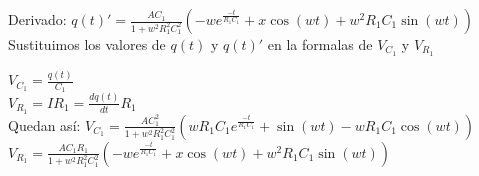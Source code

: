 \documentclass[12pt]{article}
\newcommand{\derivada}[2]{\displaystyle{\frac{d#1}{d#2}}}
\newcommand{\e}[1]{e^{#1}}
\newcommand{\escribir}[1]{\singlespacing#1\singlespacing}
\newcommand{\fraccion}[2]{\displaystyle{\frac{#1}{#2}}}
\begin{document}
	\escribir{Derivado:}
	$q(t)'=\fraccion{AC_1}{1+w^2R_1^2C_1^2}(-w\e{\frac{-t}{R_1C_1}}+x\cos(wt)+w^2R_1C_1\sin(wt))$\\
		
	\escribir{Sustituimos los valores de $q(t)$ y $q(t)'$  en la formalas de $V_{C_1}$ y $V_{R_1}$ }

	$V_{C_1}=\fraccion{q(t)}{C_1} $\\

	$V_{R_1}=IR_1=\derivada{q(t)}{t}R_1$\\

	\escribir{Quedan así:}
	$V_{C_1}=\fraccion{AC_1^2}{1+w^2R_1^2C_1^2}(wR_1C_1\e{\frac{-t}{R_1C_1}}+\sin(wt)-wR_1C_1\cos(wt))$\\

	$V_{R_1}=\fraccion{AC_1R_1}{1+w^2R_1^2C_1^2}(-w\e{\frac{-t}{R_1C_1}}+x\cos(wt)+w^2R_1C_1\sin(wt))$\\

\end{document}
